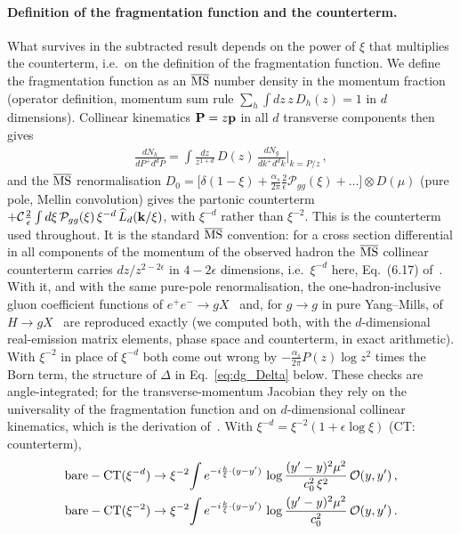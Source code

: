 \paragraph{Definition of the fragmentation function and the counterterm.} What survives in the subtracted result depends on the power of $\xi$ that multiplies the counterterm, i.e.\ on the definition of the fragmentation function. We define the fragmentation function as an $\overline{\rm MS}$ number density in the momentum fraction (operator definition, momentum sum rule $\sum_h\int dz\,z\,D_h(z)=1$ in $d$ dimensions). Collinear kinematics $\mathbf{P}=z\mathbf{p}$ in all $d$ transverse components then gives
\begin{align}
\frac{dN_h}{dP^+d^dP}=\int\frac{dz}{z^{1+d}}\,D(z)\,\frac{dN_g}{dk^+d^dk}\bigg|_{k=P/z}\,,
\end{align}
and the $\overline{\rm MS}$ renormalisation $D_0=\big[\delta(1-\xi)+\frac{\alpha_s}{2\pi}\frac2\epsilon\mathcal P_{gg}(\xi)+\dots\big]\otimes D(\mu)$ (pure pole, Mellin convolution) gives the partonic counterterm $+\mathcal C\frac2\epsilon\int d\xi\,\mathcal P_{gg}(\xi)\,\xi^{-d}\,\widehat L_d(\mathbf{k}/\xi)$, with $\xi^{-d}$ rather than $\xi^{-2}$. This is the counterterm used throughout. It is the standard $\overline{\rm MS}$ convention: for a cross section differential in all components of the momentum of the observed hadron the $\overline{\rm MS}$ collinear counterterm carries $dz/z^{2-2\epsilon}$ in $4-2\epsilon$ dimensions, i.e.\ $\xi^{-d}$ here, Eq.~(6.17) of~\cite{Catani:1996vz}. With it, and with the same pure-pole renormalisation, the one-hadron-inclusive gluon coefficient functions of $e^+e^-\to gX$~\cite{Altarelli:1979kv,Kretzer:2000yf} and, for $g\to g$ in pure Yang--Mills, of $H\to gX$~\cite{Almasy:2011eq} are reproduced exactly (we computed both, with the $d$-dimensional real-emission matrix elements, phase space and counterterm, in exact arithmetic). With $\xi^{-2}$ in place of $\xi^{-d}$ both come out wrong by $-\frac{\alpha_s}{2\pi}P(z)\log z^2$ times the Born term, the structure of $\Delta$ in Eq.~\eqref{eq:dg_Delta} below. These checks are angle-integrated; for the transverse-momentum Jacobian they rely on the universality of the fragmentation function and on $d$-dimensional collinear kinematics, which is the derivation of~\cite{Catani:1996vz}. With $\xi^{-d}=\xi^{-2}(1+\epsilon\log\xi)$ (CT: counterterm),
\begin{align}\label{eq:dg_two}
\text{bare}-\text{CT}(\xi^{-d})&\to\xi^{-2}\!\int e^{-i\frac{k}{\xi}\cdot(y-y')}\,\log\frac{(y'-y)^2\mu^2}{c_0^2\,\xi^2}\,\mathcal O(y,y')\,,\notag\\
\text{bare}-\text{CT}(\xi^{-2})&\to\xi^{-2}\!\int e^{-i\frac{k}{\xi}\cdot(y-y')}\,\log\frac{(y'-y)^2\mu^2}{c_0^2}\,\mathcal O(y,y')\,.
\end{align}
